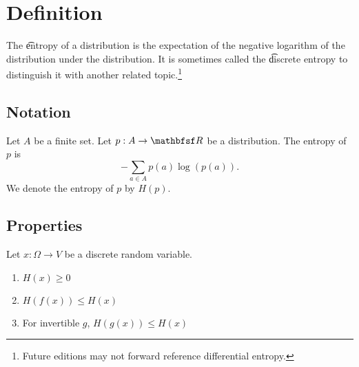 
\section*{Definition}

The \t{entropy} of a distribution is the expectation of the negative logarithm of the distribution under the distribution.
It is sometimes called the \t{discrete entropy} to distinguish it with another related topic.\footnote{Future editions may not forward reference differential entropy.}

\subsection*{Notation}

Let $A$ be a finite set.
Let $p:A \to \R $ be a distribution.
The entropy of $p$ is
\[
-\sum_{a \in A} p(a) \log(p(a)).
\]
We denote the entropy of $p$ by
$H(p)$.

\subsection*{Properties}

Let $x: \Omega  \to V$ be a discrete random variable.
    \begin{enumerate}
      \item $H(x) \geq 0$
      \item $H(f(x)) \leq H(x)$
      \item For invertible $g$, $H(g(x)) \leq H(x)$

    \end{enumerate}

\blankpage
